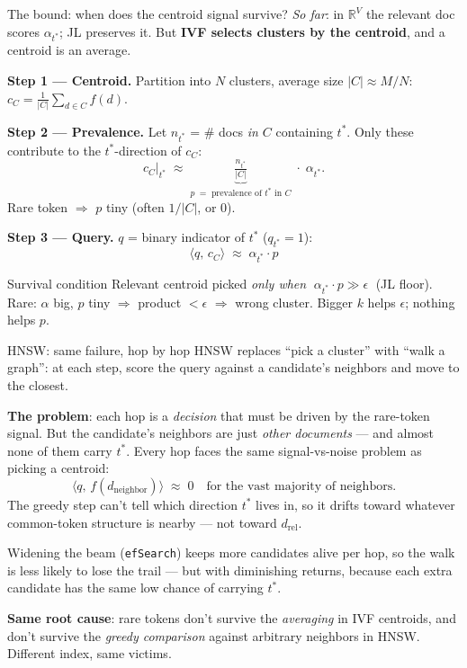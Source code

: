 \begin{frame}{The bound: when does the centroid signal survive?}
  \footnotesize \emph{So far}: in $\mathbb{R}^V$ the relevant doc scores
  $\alpha_{t^*}$; JL preserves it. But \textbf{IVF selects clusters by the
  centroid}, and a centroid is an average.

  \small
  \textbf{Step 1 --- Centroid.} Partition into $N$ clusters, average size
  $|C| \approx M/N$:
  \(
    c_C = \tfrac{1}{|C|} \sum_{d \in C} f(d).
  \)

  \textbf{Step 2 --- Prevalence.} Let $n_{t^*}$ = \# docs \emph{in $C$}
  containing $t^*$. Only these contribute to the $t^*$-direction of $c_C$:
  \[
    c_C \big|_{t^*}
    \;\approx\;
    \underbrace{\tfrac{n_{t^*}}{|C|}}_{\displaystyle p\;=\;\text{prevalence of }t^*\text{ in }C}
    \;\cdot\; \alpha_{t^*}.
  \]
  Rare token $\Rightarrow$ $p$ tiny (often $1/|C|$, or $0$).

  \textbf{Step 3 --- Query.} $q$ = binary indicator of $t^*$ ($q_{t^*}=1$):
  \[
    \boxed{\;\langle q,\, c_C \rangle \;\approx\; \alpha_{t^*} \cdot p\;}
  \]

  \begin{block}{Survival condition}
    \footnotesize\centering
    Relevant centroid picked \emph{only when} $\;\alpha_{t^*}\cdot p \gg \epsilon\;$
    (JL floor). Rare: $\alpha$ big, $p$ tiny $\Rightarrow$ product
    $<\epsilon$ $\Rightarrow$ wrong cluster.
    Bigger $k$ helps $\epsilon$; nothing helps $p$.
  \end{block}
\end{frame}

\begin{frame}{HNSW: same failure, hop by hop}
  HNSW replaces ``pick a cluster'' with ``walk a graph'': at each step,
  score the query against a candidate's neighbors and move to the closest.

  \medskip
  \textbf{The problem}: each hop is a \emph{decision} that must be driven by
  the rare-token signal. But the candidate's neighbors are just \emph{other
  documents} --- and \alert{almost none of them carry $t^*$}. Every hop faces
  the same signal-vs-noise problem as picking a centroid:
  \[
    \langle q,\, f(d_{\text{neighbor}})\rangle \;\approx\; 0
    \quad\text{for the vast majority of neighbors.}
  \]
  The greedy step can't tell which direction $t^*$ lives in, so it drifts
  toward whatever common-token structure is nearby --- not toward
  $d_{\text{rel}}$.

  \medskip
  Widening the beam (\texttt{efSearch}) keeps more candidates alive per hop,
  so the walk is less likely to lose the trail --- but with diminishing
  returns, because each extra candidate has the same low chance of carrying
  $t^*$.

  \medskip
  \textbf{Same root cause}: rare tokens don't survive the \emph{averaging} in
  IVF centroids, and don't survive the \emph{greedy comparison} against
  arbitrary neighbors in HNSW. Different index, \alert{same victims}.
\end{frame}

